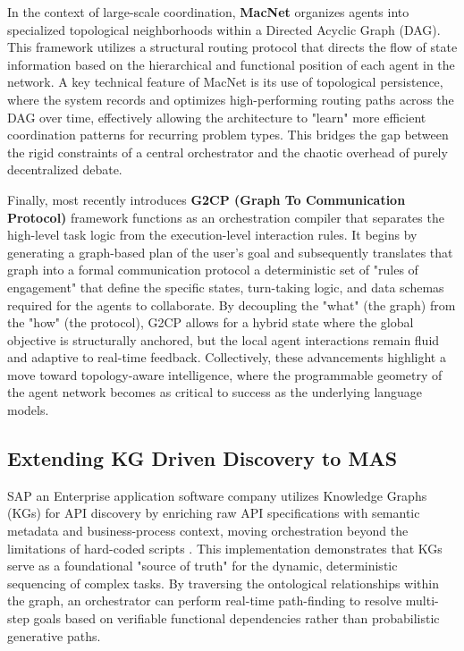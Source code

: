 In the context of large-scale coordination, \textbf{MacNet} \citep{qian2025scalinglargelanguagemodelbased} organizes agents into specialized topological neighborhoods within a Directed Acyclic Graph (DAG). This framework utilizes a structural routing protocol that directs the flow of state information based on the hierarchical and functional position of each agent in the network. A key technical feature of MacNet is its use of topological persistence, where the system records and optimizes high-performing routing paths across the DAG over time, effectively allowing the architecture to "learn" more efficient coordination patterns for recurring problem types. This bridges the gap between the rigid constraints of a central orchestrator and the chaotic overhead of purely decentralized debate.



Finally, most recently \citet{benkhaled2026g2cp} introduces \textbf{G2CP (Graph To Communication Protocol)} framework functions as an orchestration compiler that separates the high-level task logic from the execution-level interaction rules. It begins by generating a graph-based plan of the user’s goal and subsequently translates that graph into a formal communication protocol a deterministic set of "rules of engagement" that define the specific states, turn-taking logic, and data schemas required for the agents to collaborate. By decoupling the "what" (the graph) from the "how" (the protocol), G2CP allows for a hybrid state where the global objective is structurally anchored, but the local agent interactions remain fluid and adaptive to real-time feedback. Collectively, these advancements highlight a move toward topology-aware intelligence, where the programmable geometry of the agent network becomes as critical to success as the underlying language models.


\subsection{Extending KG Driven Discovery to MAS}
SAP an Enterprise application software company utilizes Knowledge Graphs (KGs) for API discovery by enriching raw API specifications with semantic metadata and business-process context, moving orchestration beyond the limitations of hard-coded scripts \citep{deeplearningai_kg_api_discovery}. This implementation demonstrates that KGs serve as a foundational "source of truth" for the dynamic, deterministic sequencing of complex tasks. By traversing the ontological relationships within the graph, an orchestrator can perform real-time path-finding to resolve multi-step goals based on verifiable functional dependencies rather than probabilistic generative paths.

